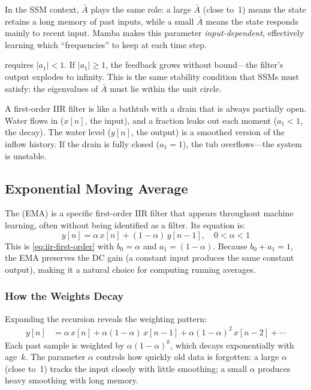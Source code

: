 In the SSM context, $\bar{A}$ plays the same role: a large $\bar{A}$
(close to~1) means the state retains a long memory of past inputs,
while a small $\bar{A}$ means the state responds mainly to recent
input. Mamba makes this parameter \emph{input-dependent}, effectively
learning which ``frequencies'' to keep at each time step.

 requires $|a_1| < 1$. If $|a_1| \geq 1$, the
feedback grows without bound---the filter's output explodes to
infinity. This is the same stability condition that SSMs must satisfy:
the eigenvalues of $\bar{A}$ must lie within the unit circle.

\begin{analogy}
A first-order IIR filter is like a bathtub with a drain that is always
partially open. Water flows in ($x[n]$, the input), and a fraction
leaks out each moment ($a_1 < 1$, the decay). The water level ($y[n]$,
the output) is a smoothed version of the inflow history. If the drain
is fully closed ($a_1 = 1$), the tub overflows---the system is
unstable.
\end{analogy}

\subsection{Exponential Moving Average}
\label{sec:dsp-ema}

The  (EMA) is a specific
first-order IIR filter that appears throughout machine learning,
often without being identified as a filter. Its equation is:
%
\begin{equation}
  y[n] = \alpha \, x[n] + (1 - \alpha) \, y[n-1],
  \quad 0 < \alpha < 1
  \label{eq:ema}
\end{equation}
%
This is \cref{eq:iir-first-order} with $b_0 = \alpha$ and
$a_1 = (1 - \alpha)$. Because $b_0 + a_1 = 1$, the EMA preserves
the DC gain (a constant input produces the same constant output),
making it a natural choice for computing running averages.

\subsubsection{How the Weights Decay}

Expanding the recursion reveals the weighting pattern:
%
\begin{align}
  y[n] &= \alpha \, x[n]
         + \alpha(1-\alpha) \, x[n-1]
         + \alpha(1-\alpha)^2 \, x[n-2] + \cdots
  \label{eq:ema-expanded}
\end{align}
%
Each past sample is weighted by $\alpha(1-\alpha)^k$, which decays
exponentially with age~$k$. The parameter $\alpha$ controls how
quickly old data is forgotten: a large $\alpha$ (close to~1) tracks
the input closely with little smoothing; a small $\alpha$ produces
heavy smoothing with long memory.

